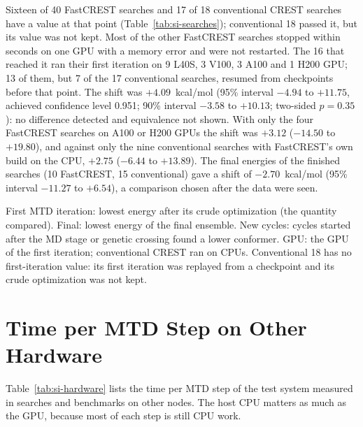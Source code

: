 \documentclass[journal=jctcce,manuscript=suppinfo]{achemso}
\newcommand{\Eh}{\ensuremath{E_\mathrm{h}}}
\begin{document}
Sixteen of 40 FastCREST searches and 17 of 18 conventional CREST searches have a value at that point (Table~\ref{tab:si-searches}); conventional 18 passed it, but its value was not kept. Most of the other FastCREST searches stopped within seconds on one GPU with a memory error
and were not restarted. The 16 that reached it ran their first iteration on 9 L40S, 3 V100, 3 A100 and 1 H200 GPU; 13 of
them, but 7 of the 17 conventional searches, resumed from checkpoints before that point. The shift was $+4.09$~kcal/mol
(95\% interval $-4.94$ to $+11.75$, achieved confidence level 0.951; 90\% interval $-3.58$ to $+10.13$; two-sided $p = 0.35$): no
difference detected and equivalence not shown. With only the four FastCREST searches on A100 or H200 GPUs the shift
was $+3.12$ ($-14.50$ to $+19.80$), and against only the nine conventional searches with FastCREST's own build on the
CPU, $+2.75$ ($-6.44$ to $+13.89$). The final energies of the finished searches (10 FastCREST, 15 conventional) gave a shift of $-2.70$~kcal/mol
(95\% interval $-11.27$ to $+6.54$), a comparison chosen after the data were seen.

\begin{table}[tbp]
\caption{Replicate Searches of the Test System. Energies in kcal/mol Relative to the Lowest Final Conformer of These Searches (Conventional 7, $-415.48139$~\Eh)}
\label{tab:si-searches}
\small


\smallskip
\begin{minipage}{\textwidth}\raggedright\footnotesize
First MTD iteration: lowest energy after its crude optimization (the quantity compared). Final: lowest energy of
the final ensemble. New cycles: cycles started after the MD stage or genetic crossing found a lower conformer. GPU: the
GPU of the first iteration; conventional CREST ran on CPUs. Conventional 18 has no first-iteration value: its first iteration was
replayed from a checkpoint and its crude optimization was not kept.
\end{minipage}
\end{table}

\section{Time per MTD Step on Other Hardware}
\label{si:hardware}

Table~\ref{tab:si-hardware} lists the time per MTD step of the test system measured in searches and benchmarks on other
nodes. The host CPU matters as much as the GPU, because most of each step is still CPU work.
\end{document}
